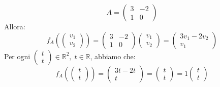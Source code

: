 \documentclass[a4paper]{article}
\theoremstyle{break}
\theoremstyle{break}
\theoremstyle{break}
\theoremstyle{break}
\begin{document}
\begin{example}
  \[
    A = \begin{pmatrix} 
      3 & -2\\
      1 & 0
    \end{pmatrix} 
  \] 
  Allora:
  \[
  f_A \left( \begin{pmatrix} v_1\\v_2 \end{pmatrix}  \right) =
  \begin{pmatrix} 
    3 & -2\\
    1 & 0
  \end{pmatrix} 
  \begin{pmatrix} 
    v_1\\
    v_2
  \end{pmatrix} 
  =
  \begin{pmatrix} 
    3v_1 - 2v_2\\
    v_1
  \end{pmatrix} 
  \] 
  Per ogni \( \begin{pmatrix} t\\t \end{pmatrix} \in \mathbb{R}^2,\; t \in \mathbb{R} \),
  abbiamo che:
  \[
  f_A \left( \begin{pmatrix} t\\t \end{pmatrix}  \right) =
  \begin{pmatrix} 
    3t - 2t\\
    t
  \end{pmatrix} 
  =
  \begin{pmatrix} 
    t\\
    t
  \end{pmatrix} 
  =
  1 \begin{pmatrix} 
    t\\
    t
  \end{pmatrix} 
  \] 


\end{example}
\end{document}
